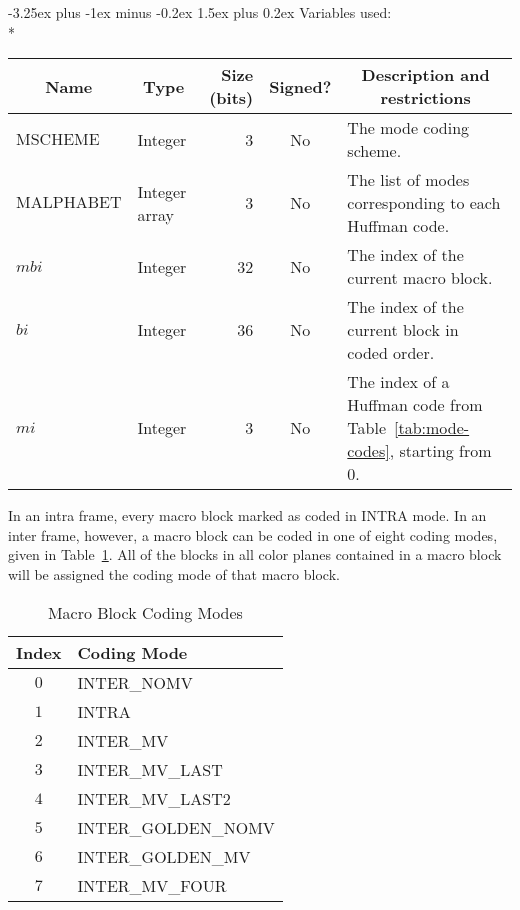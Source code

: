 \documentclass[9pt,letterpaper]{book}
\makeatletter
\newcommand{\idx}[1]{{\ensuremath{\mathit{#1}}}}
\newcommand{\bi}{\idx{bi}}
\newcommand{\mbi}{\idx{mbi}}
\newcommand{\mi}{\idx{mi}}
\newcommand{\locvar}[1]{\ensuremath{\mathrm{#1}}}
\numberwithin{equation}{chapter}
\numberwithin{figure}{chapter}
\numberwithin{table}{chapter}
\renewcommand{\paragraph}{\@startsection{paragraph}{4}{0ex}%
 {-3.25ex plus -1ex minus -0.2ex}%
 {1.5ex plus 0.2ex}%
 {\normalfont\normalsize\bfseries}}
\makeatother
\begin{document}
\paragraph{Variables used:}\hfill\\*
\begin{tabularx}{\textwidth}{@{}llrcX@{}}\toprule
\multicolumn{1}{c}{Name} &
\multicolumn{1}{c}{Type} &
\multicolumn{1}{p{30pt}}{\centering Size (bits)} &
\multicolumn{1}{c}{Signed?} &
\multicolumn{1}{c}{Description and restrictions} \\\midrule\endhead
\locvar{MSCHEME}   & Integer &  3 & No & The mode coding scheme. \\
\locvar{MALPHABET} & \multicolumn{1}{p{40pt}}{Integer array}
                             &  3 & No & The list of modes corresponding to each
 Huffman code. \\
\locvar{\mbi}      & Integer & 32 & No & The index of the current macro
 block. \\
\locvar{\bi}       & Integer & 36 & No & The index of the current block in
 coded order. \\
\locvar{\mi}       & Integer &  3 & No & The index of a Huffman code from
 Table~\ref{tab:mode-codes}, starting from $0$. \\
\bottomrule\end{tabularx}
\medskip

In an intra frame, every macro block marked as coded in INTRA mode.
In an inter frame, however, a macro block can be coded in one of eight coding
 modes, given in Table~\ref{tab:coding-modes}.
All of the blocks in all color planes contained in a macro block will be
 assigned the coding mode of that macro block.

\begin{table}[htbp]
\begin{center}
\begin{tabular}{cl}\toprule
Index & Coding Mode \\\midrule
$0$   & INTER\_NOMV         \\
$1$   & INTRA               \\
$2$   & INTER\_MV           \\
$3$   & INTER\_MV\_LAST     \\
$4$   & INTER\_MV\_LAST2    \\
$5$   & INTER\_GOLDEN\_NOMV \\
$6$   & INTER\_GOLDEN\_MV   \\
$7$   & INTER\_MV\_FOUR     \\
\bottomrule\end{tabular}
\end{center}
\caption{Macro Block Coding Modes}
\label{tab:coding-modes}
\end{table}
\end{document}
